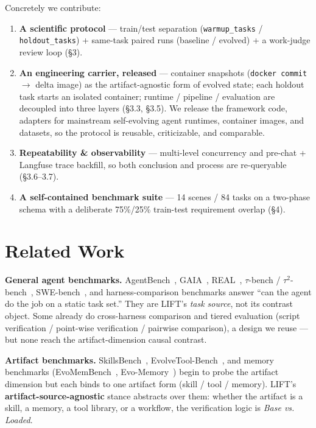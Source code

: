 \documentclass{article}
\begin{document}
Concretely we contribute:

\begin{enumerate}
\item \textbf{A scientific protocol} --- train/test separation (\texttt{warmup\_tasks} / \texttt{holdout\_tasks}) + same-task paired runs (baseline / evolved) + a work-judge review loop (\S3).
\item \textbf{An engineering carrier, released} --- container snapshots (\texttt{docker commit} $\rightarrow$ delta image) as the artifact-agnostic form of evolved state; each holdout task starts an isolated container; runtime / pipeline / evaluation are decoupled into three layers (\S3.3, \S3.5). We release the framework code, adapters for mainstream self-evolving agent runtimes, container images, and datasets, so the protocol is reusable, criticizable, and comparable.
\item \textbf{Repeatability \& observability} --- multi-level concurrency and pre-chat + Langfuse trace backfill, so both conclusion and process are re-queryable (\S3.6--3.7).
\item \textbf{A self-contained benchmark suite} --- 14 scenes / 84 tasks on a two-phase schema with a deliberate 75\%/25\% train-test requirement overlap (\S4).
\end{enumerate}


\section{Related Work}

\textbf{General agent benchmarks.} AgentBench~\citep{liu2023agentbench}, GAIA~\citep{mialon2023gaia}, REAL~\citep{garg2025real}, $\tau$-bench / $\tau^2$-bench~\citep{yao2024taubench,barres2025tau2bench}, SWE-bench~\citep{jimenez2024swebench}, and harness-comparison benchmarks answer ``can the agent do the job on a static task set.'' They are LIFT's \emph{task source}, not its contrast object. Some already do cross-harness comparison and tiered evaluation (script verification / point-wise verification / pairwise comparison), a design we reuse --- but none reach the artifact-dimension causal contrast.

\textbf{Artifact benchmarks.} SkillsBench~\citep{li2026skillsbench}, EvolveTool-Bench~\citep{kaliyev2026evolvetoolbench}, and memory benchmarks (EvoMemBench~\citep{wang2026evomembench}, Evo-Memory~\citep{wei2025evomemory}) begin to probe the artifact dimension but each binds to one artifact form (skill / tool / memory). LIFT's \textbf{artifact-source-agnostic} stance abstracts over them: whether the artifact is a skill, a memory, a tool library, or a workflow, the verification logic is \emph{Base vs. Loaded}.
\end{document}
